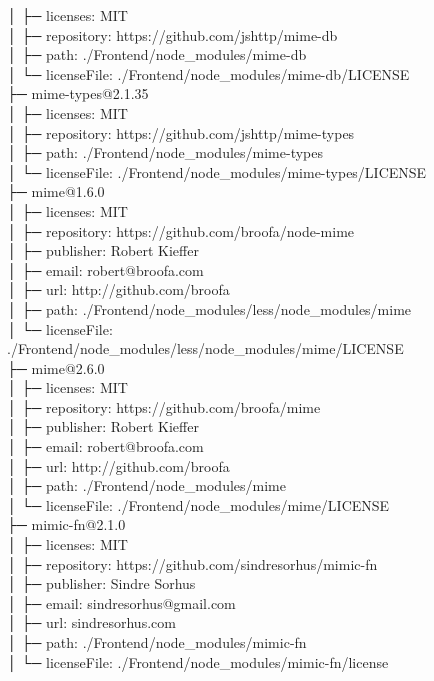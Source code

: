 │  ├─ licenses: MIT\\
│  ├─ repository: https://github.com/jshttp/mime-db\\
│  ├─ path: ./Frontend/node\_modules/mime-db\\
│  └─ licenseFile: ./Frontend/node\_modules/mime-db/LICENSE\\
├─ mime-types@2.1.35\\
│  ├─ licenses: MIT\\
│  ├─ repository: https://github.com/jshttp/mime-types\\
│  ├─ path: ./Frontend/node\_modules/mime-types\\
│  └─ licenseFile: ./Frontend/node\_modules/mime-types/LICENSE\\
├─ mime@1.6.0\\
│  ├─ licenses: MIT\\
│  ├─ repository: https://github.com/broofa/node-mime\\
│  ├─ publisher: Robert Kieffer\\
│  ├─ email: robert@broofa.com\\
│  ├─ url: http://github.com/broofa\\
│  ├─ path: ./Frontend/node\_modules/less/node\_modules/mime\\
│  └─ licenseFile: ./Frontend/node\_modules/less/node\_modules/mime/LICENSE\\
├─ mime@2.6.0\\
│  ├─ licenses: MIT\\
│  ├─ repository: https://github.com/broofa/mime\\
│  ├─ publisher: Robert Kieffer\\
│  ├─ email: robert@broofa.com\\
│  ├─ url: http://github.com/broofa\\
│  ├─ path: ./Frontend/node\_modules/mime\\
│  └─ licenseFile: ./Frontend/node\_modules/mime/LICENSE\\
├─ mimic-fn@2.1.0\\
│  ├─ licenses: MIT\\
│  ├─ repository: https://github.com/sindresorhus/mimic-fn\\
│  ├─ publisher: Sindre Sorhus\\
│  ├─ email: sindresorhus@gmail.com\\
│  ├─ url: sindresorhus.com\\
│  ├─ path: ./Frontend/node\_modules/mimic-fn\\
│  └─ licenseFile: ./Frontend/node\_modules/mimic-fn/license\\
